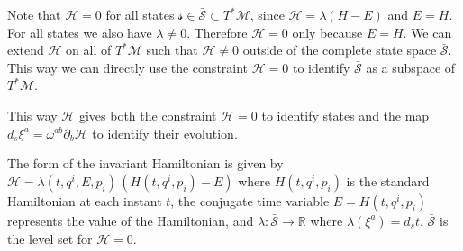 \documentclass[smallextended]{svjour3}
\numberwithin{equation}{section}
\begin{document}
Note that $\mathcal{H}=0$ for all states $\mathcal{s} \in \bar{\mathcal{S}} \subset T^* \mathcal{M}$, since $\mathcal{H}=\lambda(H-E)$ and $E = H$. For all states we also have $\lambda \neq 0$. Therefore $\mathcal{H}=0$ only because $E = H$. We can extend $\mathcal{H}$ on all of $T^* \mathcal{M}$ such that $\mathcal{H} \neq 0$ outside of the complete state space $\bar{\mathcal{S}}$. This way we can directly use the constraint $\mathcal{H}=0$ to identify $\bar{\mathcal{S}}$ as a subspace of $T^* \mathcal{M}$.

This way $\mathcal{H}$ gives both the constraint $\mathcal{H}=0$ to identify states and the map $d_s \xi^a=\omega^{ab} \partial_b \mathcal{H}$ to identify their evolution.

\begin{prop}\label{prop:form_of_invariant_hamiltonian}
	The form of the invariant Hamiltonian is given by $\mathcal{H} = \lambda(t,q^i,E,p_i) \,  (H(t,q^i,p_i) - E)$ where $H(t,q^i,p_i)$ is the standard Hamiltonian at each instant $t$, the conjugate time variable $E = H(t,q^i,p_i)$ represents the value of the Hamiltonian, and  $\lambda : \bar{\mathcal{S}} \rightarrow \mathbb{R}$ where $\lambda(\xi^a) = d_s t$. $\bar{\mathcal{S}}$ is the level set for $\mathcal{H} = 0$.
\end{prop}
\end{document}
